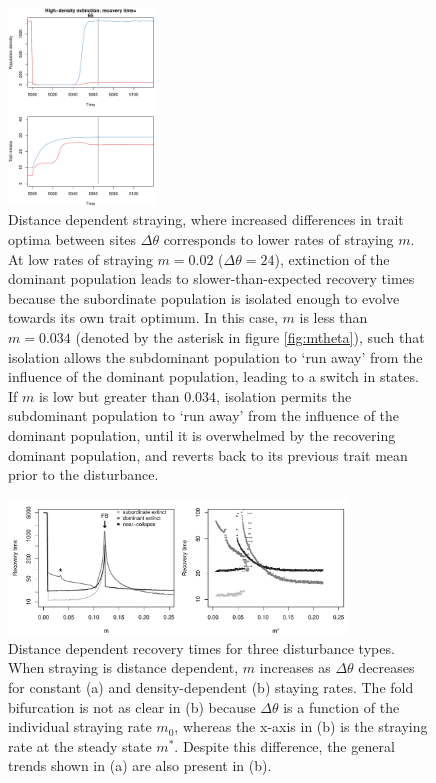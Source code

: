 \documentclass[twocolumn,preprintnumbers,amsmath,amssymb,superscriptaddress]{revtex4}
\begin{document}
\begin{figure}
  \captionsetup{justification=raggedright,
singlelinecheck=false
}
\centering
\includegraphics[width=0.35\textwidth]{figs2/fig_relax_inertia.pdf}
\caption{
Distance dependent straying, where increased differences in trait optima between sites $\Delta\theta$ corresponds to lower rates of straying $m$.
At low rates of straying $m=0.02$ ($\Delta\theta=24$), extinction of the dominant population leads to slower-than-expected recovery times because the subordinate population is isolated enough to evolve towards its own trait optimum. %
In this case, $m$ is less than $m=0.034$ (denoted by the asterisk in figure \ref{fig:mtheta}), such that isolation allows the subdominant population to `run away' from the influence of the dominant population, leading to a switch in states.
If $m$ is low but greater than $0.034$, isolation permits the subdominant population to `run away' from the influence of the dominant population, until it is overwhelmed by the recovering dominant population, and reverts back to its previous trait mean prior to the disturbance.
} \label{fig:inertia}
\end{figure}

\begin{figure}
  \captionsetup{justification=raggedright,
singlelinecheck=false
}
  \centering
  \includegraphics[width=0.8\textwidth]{figs2/fig_relax_mtheta.pdf}
  \caption{
  Distance dependent recovery times for three disturbance types. When straying is distance dependent, $m$ increases as $\Delta\theta$ decreases for constant (a) and density-dependent (b) staying rates.
  The fold bifurcation is not as clear in (b) because $\Delta\theta$ is a function of the individual straying rate $m_0$, whereas the x-axis in (b) is the straying rate at the steady state $m^*$.
  Despite this difference, the general trends shown in (a) are also present in (b).
  } \label{fig:mthetamvm}
\end{figure}
\end{document}
